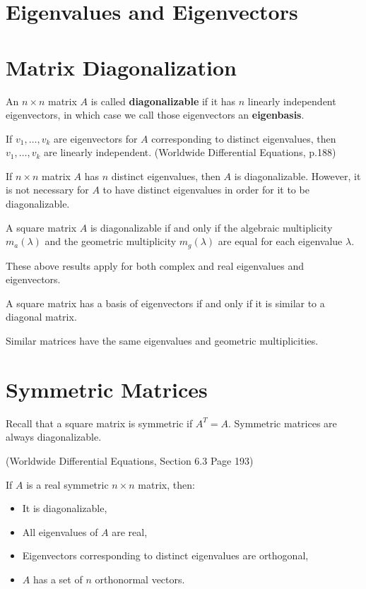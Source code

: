 \documentclass[12pt]{article}
\begin{document}
\section{Eigenvalues and Eigenvectors}

\section{Matrix Diagonalization}

An $n \times n$ matrix $A$ is called \textbf{diagonalizable} if it has $n$ linearly independent eigenvectors, in which case we call those eigenvectors an \textbf{eigenbasis}.

If $v_1, \ldots, v_k$ are eigenvectors for $A$ corresponding to distinct eigenvalues, then $v_1, \ldots, v_k$ are linearly independent. (Worldwide Differential Equations, p.188)

If $n \times n$ matrix $A$ has $n$ distinct eigenvalues, then $A$ is diagonalizable. However, it is not necessary for $A$ to have distinct eigenvalues in order for it to be diagonalizable.

A square matrix $A$ is diagonalizable if and only if the algebraic multiplicity $m_a(\lambda)$ and the geometric multiplicity $m_g(\lambda)$ are equal for each eigenvalue $\lambda$.

These above results apply for both complex and real eigenvalues and eigenvectors.

A square matrix has a basis of eigenvectors if and only if it is similar to a diagonal matrix.

Similar matrices have the same eigenvalues and geometric multiplicities.

\section{Symmetric Matrices}

Recall that a square matrix is symmetric if $A^T = A$. Symmetric matrices are always diagonalizable.

(Worldwide Differential Equations, Section 6.3 Page 193)

If $A$ is a real symmetric $n \times n$ matrix, then: \begin{itemize}
\item It is diagonalizable,
\item All eigenvalues of $A$ are real,
\item Eigenvectors corresponding to distinct eigenvalues are orthogonal,
\item $A$ has a set of $n$ orthonormal vectors.
\end{itemize} 
\end{document}

